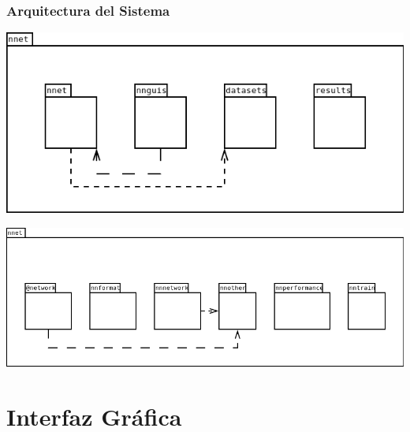 \documentclass[compress,allowframebreaks]{beamer}
\begin{document}
			\begin{frame}[allowframebreaks]
				\frametitle{\normalsize Arquitectura del Sistema}

				\centering
				\includegraphics[scale=0.45]{uml/DiagramaPaquetes0.png}
				
				\centering
				\includegraphics[scale=0.35]{uml/DiagramaPaquetes1.png}
			\end{frame}

	\section{Interfaz Gráfica}
\end{document}
